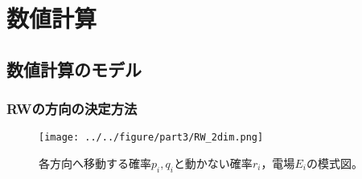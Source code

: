 \documentclass[autodetect-engine,dvi=dvipdfmx,a4paper,ja=standard,oneside,openany,11pt,draft]{bxjsbook}
\begin{document}
\chapter{数値計算}
\section{数値計算のモデル}
\subsection{RWの方向の決定方法}
\begin{figure}[htbp]
  \centering
  \texttt{[image: ../../figure/part3/RW\_2dim.png]}
  \caption{各方向へ移動する確率$p_i,q_i$と動かない確率$r_i$，電場$E_i$の模式図。}
  \label{fig:RW_2dim}
\end{figure}
\end{document}
